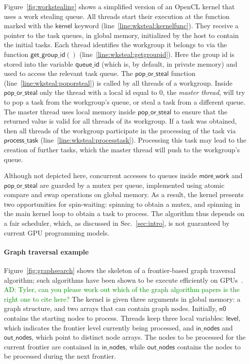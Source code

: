 \documentclass[numbers,nocopyrightspace,10pt]{sigplanconf}
\newcommand{\ADComment}[1]{\textcolor{green}{AD: #1}}
\newcommand{\myfiglong}{Figure~}
\newcommand{\mysec}{Sec.~}
\newcommand{\getgroupid}{\mathsf{get\_group\_id}}
\newcommand{\keyword}[1]{\mathsf{#1}}
\begin{document}
\myfiglong\ref{fig:workstealing} shows a simplified version of an OpenCL
kernel that uses a work stealing queue. All threads start their
execution at the function marked with the $\mathsf{kernel}$ keyword
(line~\ref{line:wksteal:kernelfunc}). They receive a pointer to the task
queues, in global memory, initialized by the
host to contain the initial tasks. Each thread identifies
the workgroup it belongs to via the function $\getgroupid()$
(line~\ref{line:wksteal:getgroupid}). Here the group id is stored into
the variable $\mathsf{queue\_id}$ (which is, by default, in private
memory) and used to access the relevant task queue. The
$\mathsf{pop\_or\_steal}$ function (line~\ref{line:wksteal:poporsteal})
is called by all threads of a workgroup.  Inside
$\mathsf{pop\_or\_steal}$ only the thread with a local id equal to $0$,
the \emph{master thread}, will try to pop a
task from the workgroup's queue, or steal a task from a different
queue. The master thread uses local memory inside
$\mathsf{pop\_or\_steal}$ to ensure that the returned value is valid for
all threads of its workgroup. If a task was obtained, then all threads
of the workgroup participate in the processing of the task via 
$\mathsf{process\_task}$ (line~\ref{line:wksteal:processtask}).
Processing this task may lead to the creation of further tasks, which
the master thread will push to the workgroup's queue.

Although not depicted here, concurrent accesses to queues inside
$\mathsf{more\_work}$ and $\mathsf{pop\_or\_steal}$ are guarded by a
mutex per queue, implemented using atomic compare and swap operations
on global memory.  As a result, the kernel presents two opportunities
for spin-waiting: spinning to obtain a mutex, and spinning in the main
kernel loop to obtain a task to process.  The algorithm thus depends
on a fair scheduler, which, as discussed in \mysec\ref{sec:intro}, is
not guaranteed by current GPU programming models.

\paragraph{Graph traversal example} \myfiglong\ref{fig:graphsearch} shows the
skeleton of a frontier-based graph traversal algorithm; such algorithms have
been shown to be execute efficiently on GPUs~\cite{...}. \ADComment{Tyler, can you please work out which of the graph algorithm papers is the right one to cite here?}
The kernel is
given three arguments in global memory: a graph structure, and two
arrays that can contain graph nodes. Initially, $\keyword{n0}$ contains the
starting nodes to process. Threads keep three local variables: $\keyword{level}$, which indicates the frontier level currently being
processed, and $\keyword{in\_nodes}$ and $\keyword{out\_nodes}$, which point to
distinct node arrays. The nodes to be
processed for the current frontier are contained in $\keyword{in\_nodes}$, while $\keyword{out\_nodes}$ contains
the nodes to be processed during the next frontier.
\end{document}
